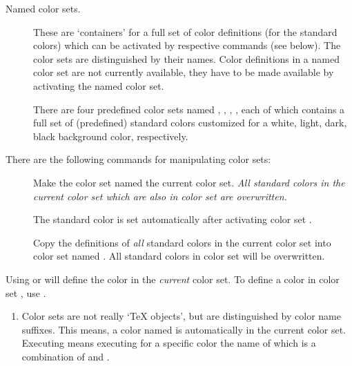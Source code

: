 \begin{slide}
\begin{description}
    \newslide

  \item[Named color sets.] These are `containers' for a full set of color definitions (for the standard colors) which
    can be activated by respective commands (see below). The color sets are distinguished by their names. Color
    definitions in a named color set are not currently available, they have to be made available by activating the named
    color set.

    There are four predefined color sets named ,
    , ,
    , each of which contains a full set of (predefined)
    standard colors customized for a white, light, dark, black background
    color, respectively.
  \end{description}

  \newslide

  There are the following commands for manipulating color sets:
  \begin{description}
  \item[]
    Make the color set named  the current color set.
    \emph{All standard colors in the current color set which are also in color set  are overwritten.}

    The standard color  is set automatically after activating color set .

  \item[]
    Copy the definitions of \emph{all} standard colors in the
    current color set into color set named . All standard colors in color set  will be
    overwritten.
  \end{description}

  \newslide

  Using  or  will define the color
   in the \emph{current} color set. To define a color in color set , use
  .

    \newslide

  \begin{enumerate}
  \item Color sets are not really `\TeX{} objects', but are distinguished by color name suffixes. This means, a color
    named  is automatically in the current color set. Executing 
    means executing  for a specific color the name of which is a combination of  and
    .


\end{enumerate}
\end{slide}
